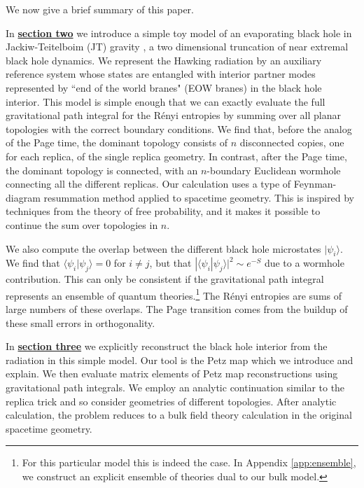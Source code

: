\documentclass[12pt]{article}
\numberwithin{equation}{section}
\begin{document}
We now give a brief summary of this paper.

In \hyperref[sec:asimplemodel]{{\bf section two}}
we introduce a simple toy model of an evaporating black hole in Jackiw-Teitelboim (JT) gravity \cite{Teitelboim:1983ux,Jackiw:1984je,Almheiri:2014cka}, a two dimensional truncation of near extremal black hole dynamics.   We represent the Hawking radiation by an auxiliary reference system whose states are entangled with interior partner modes represented by ``end of the world branes" (EOW branes) in the black hole interior.   This model is simple enough that we can exactly evaluate the full gravitational path integral for the R\'{e}nyi entropies by summing over all {planar} topologies with the correct boundary conditions.  We find that, before the analog of the Page time, the dominant topology consists of $n$ disconnected copies, one for each replica, of the single replica geometry. In contrast, after the Page time, the dominant topology is connected, with an $n$-boundary Euclidean wormhole connecting all the different replicas. {Our calculation uses a type of Feynman-diagram resummation method applied to spacetime geometry. This is inspired by techniques from the theory of free probability, and it makes it possible to continue the sum over topologies in $n$.}

We also compute the overlap between the different black hole microstates $| \psi_i \rangle$. We find that $\langle \psi_i | \psi_j\rangle = 0$ for $i \neq j$, but that $|\langle \psi_i | \psi_j\rangle |^2 \sim e^{-S}$ due to a wormhole contribution. This can only be consistent if the gravitational path integral represents an ensemble of quantum theories.\footnote{For this particular model this is indeed the case. In Appendix \ref{app:ensemble}, we construct an explicit ensemble of theories dual to our bulk model.}    The R\'{e}nyi entropies are sums of large numbers of these overlaps.  The Page transition comes from the buildup of these small errors in orthogonality.

In \hyperref[sec:petz]{{\bf section three}} we explicitly reconstruct the black hole interior  from the radiation in this simple model.  Our tool is the Petz map which we introduce and explain.   We then evaluate matrix elements of Petz map reconstructions using gravitational path integrals.  We employ  an analytic continuation similar to the replica trick and so consider geometries of different topologies. After analytic calculation, the problem reduces to a bulk field theory calculation in the original spacetime geometry.  
\end{document}
